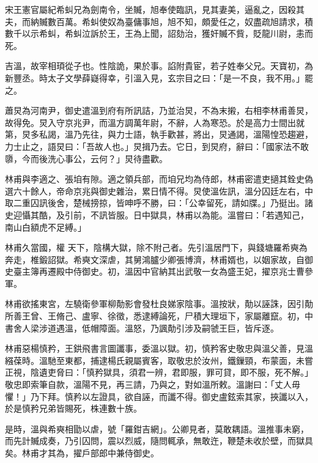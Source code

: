 \begin{pinyinscope}
 宋王憲官屬紀希虯兄為劍南令，坐贓，旭奉使臨訊，見其妻美，逼亂之，因殺其夫，而納贓數百萬。希虯使奴為臺傭事旭，旭不知，頗愛任之，奴盡疏旭請求，積數千以示希虯，希虯泣訴於王，王為上聞，詔劾治，獲奸贓不貲，貶龍川尉，恚而死。



 吉溫，故宰相頊從子也。性陰詭，果於事。諂附貴宦，若子姓奉父兄。天寶初，為新豐丞。時太子文學薛嶷得幸，引溫入見，玄宗目之曰：「是一不良，我不用。」罷之。



 蕭炅為河南尹，御史遣溫到府有所訊詰，乃並治炅，不為末摋，右相李林甫善炅，故得免。炅入守京兆尹，而溫方調萬年尉，不辭，人為寒恐。於是高力士間出就第，炅多私謁，溫乃先往，與力士語，執手歡甚，將出，炅通謁，溫陽惶恐趨避，力士止之，語炅曰：「吾故人也。」炅揖乃去。它日，到炅府，辭曰：「國家法不敢隳，今而後洗心事公，云何？」炅待盡歡。



 林甫與李適之、張垍有隙。適之領兵部，而垍兄均為侍郎，林甫密遣吏擿其銓史偽選六十餘人，帝命京兆與御史雜治，累日情不得。炅使溫佐訊，溫分囚廷左右，中取二重囚訊後舍，楚械搒掠，皆呻呼不勝，曰：「公幸留死，請如牒。」乃挺出。諸史迎懾其酷，及引前，不訊皆服。日中獄具，林甫以為能。溫嘗曰：「若遇知己，南山白額虎不足縛。」


林甫久當國，權
 天下，陰構大獄，除不附己者。先引溫居門下，與錢塘羅希奭為奔走，椎鍛詔獄。希奭文深虐，其舅鴻臚少卿張博濟，林甫婿也，以姻家故，自御史臺主簿再遷殿中侍御史。初，溫因中官納其出武敬一女為盛王妃，擢京兆士曹參軍。



 林甫欲搖東宮，左驍衛參軍柳勣影會發杜良娣家陰事。溫按狀，勣以誣誅，因引勣所善王曾、王脩己、盧寧、徐徵，悉逮縛論死，尸積大理垣下，家屬離竄。初，中書舍人梁涉道遇溫，低帽障面。溫怒，乃諷勣引涉及嗣虢王巨，皆斥逐。



 林甫惡楊慎矜，王鉷飛書言圖讖事，委溫以獄。初，慎矜客史敬忠與溫父善，見溫繦葆時。溫馳至東都，捕逮楊氏親屬賓客，取敬忠於汝州，鐵鏁頸，布蒙面，未嘗正視，陰遺吏脅曰：「慎矜獄具，須君一辨，君即服，罪可貸，即不服，死不解。」敬忠即索筆自款，溫陽不見，再三請，乃與之，對如溫所敕。溫謝曰：「丈人毋懼！」乃下拜。慎矜以左證具，欲自誣，而讖不得。御史盧鉉索其家，挾讖以入，於是慎矜兄弟皆賜死，株連數十族。



 是時，溫與希奭相勖以虐，號「羅鉗吉網」。公卿見者，莫敢耦語。溫推事未窮，而先計贓成奏，乃引囚問，震以烈威，隨問輒承，無敢迕，鞭楚未收於壁，而獄具矣。林甫才其為，擢戶部郎中兼侍御史。




\end{pinyinscope}
